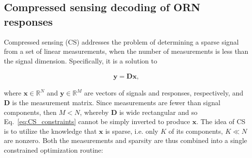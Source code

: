\documentclass[9pt,lineno]{elife}
\begin{document}






\subsection{Compressed sensing decoding of ORN responses} 




Compressed sensing (CS) addresses the problem of determining a sparse signal from a set of linear measurements, when the number of measurements is less than the signal dimension. Specifically, it is a solution to 

\begin{align}
\mathbf y = \mathbf D\mathbf x,
\label{eq:CS_constraints}
\end{align} 

where $\mathbf x \in \mathbb{R}^N$ and $\mathbf y\in \mathbb{R}^M$ are vectors of signals and responses, respectively, and $\mathbf D$ is the measurement matrix. Since measurements are fewer than signal components, then $M < N$, whereby $\mathbf D$ is wide rectangular and so Eq.~\ref{eq:CS_constraints} cannot be simply inverted to produce $\mathbf x$. The idea of CS is to utilize the knowledge that $\mathbf x$ is sparse, i.e. only $K$ of its components, $K \ll N$ are nonzero. Both the measurements and sparsity are thus combined into a single constrained optimization routine:
\end{document}
